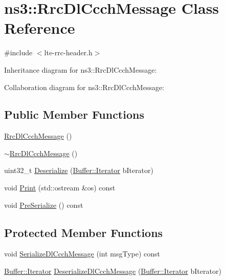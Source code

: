 \hypertarget{classns3_1_1RrcDlCcchMessage}{}\section{ns3\+:\+:Rrc\+Dl\+Ccch\+Message Class Reference}
\label{classns3_1_1RrcDlCcchMessage}


{\ttfamily \#include $<$lte-\/rrc-\/header.\+h$>$}



Inheritance diagram for ns3\+:\+:Rrc\+Dl\+Ccch\+Message\+:


Collaboration diagram for ns3\+:\+:Rrc\+Dl\+Ccch\+Message\+:
\subsection*{Public Member Functions}
\begin{DoxyCompactItemize}
\item 
\hyperlink{classns3_1_1RrcDlCcchMessage_a07412f3c07df5e3fb2bfa6422bffedb3}{Rrc\+Dl\+Ccch\+Message} ()
\item 
\hyperlink{classns3_1_1RrcDlCcchMessage_a8dedc907f58a282f564def377117aaf2}{$\sim$\+Rrc\+Dl\+Ccch\+Message} ()
\item 
uint32\+\_\+t \hyperlink{classns3_1_1RrcDlCcchMessage_a302e719efa5b9e43c0a4acd097c65b57}{Deserialize} (\hyperlink{classns3_1_1Buffer_1_1Iterator}{Buffer\+::\+Iterator} b\+Iterator)
\item 
void \hyperlink{classns3_1_1RrcDlCcchMessage_aada0408bd2f079f40b60cb2ed2c24d77}{Print} (std\+::ostream \&os) const 
\item 
void \hyperlink{classns3_1_1RrcDlCcchMessage_a51efa4b8f9fe4c4078f771029793a369}{Pre\+Serialize} () const 
\end{DoxyCompactItemize}
\subsection*{Protected Member Functions}
\begin{DoxyCompactItemize}
\item 
void \hyperlink{classns3_1_1RrcDlCcchMessage_ad9df8191a3ee4f9e7f0343f5b515565f}{Serialize\+Dl\+Ccch\+Message} (int msg\+Type) const 
\item 
\hyperlink{classns3_1_1Buffer_1_1Iterator}{Buffer\+::\+Iterator} \hyperlink{classns3_1_1RrcDlCcchMessage_a113d0d3c8e4cf337e3bc555c20079aff}{Deserialize\+Dl\+Ccch\+Message} (\hyperlink{classns3_1_1Buffer_1_1Iterator}{Buffer\+::\+Iterator} b\+Iterator)
\end{DoxyCompactItemize}
